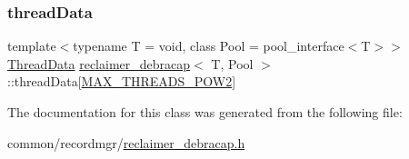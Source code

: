 \mbox{\label{classreclaimer__debracap_a3850a9ce45071232e789ea24d8c0c9df}} 
\subsubsection{\texorpdfstring{thread\+Data}{threadData}}
{\footnotesize\ttfamily template$<$typename T  = void, class Pool  = pool\+\_\+interface$<$\+T$>$$>$ \\
\hyperlink{classreclaimer__debracap_1_1ThreadData}{Thread\+Data} \hyperlink{classreclaimer__debracap}{reclaimer\+\_\+debracap}$<$ T, Pool $>$\+::thread\+Data\mbox{[}\hyperlink{plaf_8h_ac1585a3455dd3e33e877e588be9e466b}{M\+A\+X\+\_\+\+T\+H\+R\+E\+A\+D\+S\+\_\+\+P\+O\+W2}\mbox{]}\hspace{0.3cm}{\ttfamily [protected]}}



The documentation for this class was generated from the following file\+:\begin{DoxyCompactItemize}
\item 
common/recordmgr/\hyperlink{reclaimer__debracap_8h}{reclaimer\+\_\+debracap.\+h}\end{DoxyCompactItemize}
